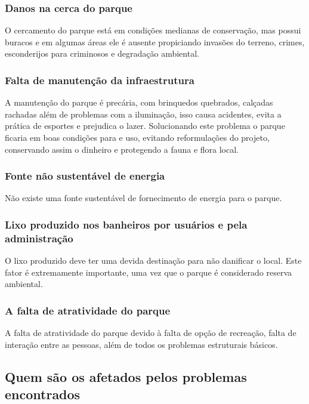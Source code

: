 \subsubsection{Danos na cerca do parque}

O cercamento do parque est\'a em condi\c{c}\~oes medianas de conserva\c{c}\~ao, mas possui buracos e em algumas \'areas ele \'e ausente propiciando invas\~oes do terreno, crimes, esconderijos para criminosos e degrada\c{c}\~ao ambiental.

\subsubsection{Falta de manuten\c{c}\~ao da infraestrutura}

A manuten\c{c}\~ao do parque \'e prec\'aria, com brinquedos quebrados, cal\c{c}adas rachadas al\'em de problemas com a ilumina\c{c}\~ao, isso causa acidentes, evita a pr\'atica de esportes e prejudica o lazer. Solucionando este problema o parque ficaria em boas condi\c{c}\~oes para e uso, evitando reformula\c{c}\~oes do projeto, conservando assim o dinheiro e protegendo a fauna e flora local. 

\subsubsection{Fonte n\~ao sustent\'avel de energia}

N\~ao existe uma fonte sustent\'avel de fornecimento de energia para o parque.

\subsubsection{Lixo produzido nos banheiros por usu\'arios e pela administra\c{c}\~ao}

O lixo produzido deve ter uma devida destina\c{c}\~ao para n\~ao danificar o local. Este fator \'e extremamente importante, uma vez que o parque \'e considerado reserva ambiental.

\subsubsection{A falta de atratividade do parque}

A falta de atratividade do parque devido \`a falta de op\c{c}\~ao de recrea\c{c}\~ao, falta de intera\c{c}\~ao entre as pessoas, al\'em de todos os problemas estruturais b\'asicos.

\subsection{Quem s\~ao os afetados pelos problemas encontrados}

